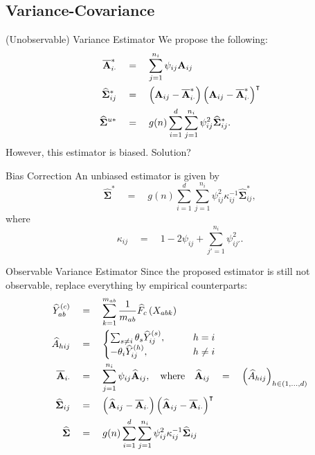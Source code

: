 \documentclass[xcolor=dvipsnames, aspectratio = 169]{beamer}
\begin{document}
\subsection*{Variance-Covariance}
\begin{frame}{(Unobservable) Variance Estimator}
We propose the following:
\begin{align*}
	\overline{\mathbf{A}}_{i\cdot}^{*} \quad &= \quad \sum_{j=1}^{n_i} \psi_{ij}\mathbf{A}_{ij} \\
	\widehat{\bm{\Sigma}}_{ij}^{*} \quad &= \quad \left(\mathbf{A}_{ij} - \overline{\mathbf{A}}_{i\cdot}^{*}\right)\left(\mathbf{A}_{ij} - \overline{\mathbf{A}}_{i\cdot}^{*}\right)^{\intercal} \\
	\widehat{\bm{\Sigma}}^{u*} \quad &= \quad g(n)\sum_{i=1}^d\sum_{j=1}^{n_i}\psi_{ij}^2 \widehat{\bm{\Sigma}}_{ij}^{*}.
\end{align*}
However, this estimator is biased. Solution?
\end{frame}
\begin{frame}{Bias Correction}
An unbiased estimator is given by
\begin{equation*}
	\widehat{\bm{\Sigma}}^{*} \quad = \quad g(n)\sum_{i=1}^d\sum_{j=1}^{n_i} \psi_{ij}^2 \kappa_{ij}^{-1} \widehat{\bm{\Sigma}}_{ij}^{*},
\end{equation*}
where 
\begin{equation*}
	\kappa_{ij} \quad = \quad 1 - 2\psi_{ij} + \sum_{j' = 1}^{n_i}\psi_{ij'}^2.
\end{equation*}
\end{frame}

\begin{frame}{Observable Variance Estimator}
Since the proposed estimator is still not observable, replace everything by empirical counterparts:
\begin{align*}
	\widehat{Y}_{ab}^{(c)} \quad &= \quad \sum_{k=1}^{m_{ab}} \frac{1}{m_{ab}} \widehat{F}_{c}\left(X_{abk}\right) \\
	\widehat{A}_{hij} \quad &= \quad \begin{cases}
		\sum_{s\neq i} \theta_s \widehat{Y}_{ij}^{(s)},& \qquad h = i \\
		- \theta_i \widehat{Y}_{ij}^{(h)},& \qquad h \neq i \\
	\end{cases} \\
	\overline{\mathbf{A}}_{i\cdot} \quad &= \quad \sum_{j=1}^{n_i}\psi_{ij}\widehat{\mathbf{A}}_{ij}, \quad \text{where} \quad \widehat{\mathbf{A}}_{ij} \quad = \quad \left(\widehat{A}_{hij}\right)_{h \in (1,...,d)} \\
	\widehat{\bm{\Sigma}}_{ij} \quad &= \quad \left( \widehat{\mathbf{A}}_{ij} - \overline{\mathbf{A}}_{i\cdot} \right)\left( \widehat{\mathbf{A}}_{ij} - \overline{\mathbf{A}}_{i\cdot} \right)^{\intercal} \\
	\widehat{\bm{\Sigma}} \quad &= \quad g(n) \sum_{i=1}^d\sum_{j=1}^{n_i} \psi_{ij}^2 \kappa_{ij}^{-1} \widehat{\bm{\Sigma}}_{ij}
\end{align*}
\end{frame}
\end{document}

